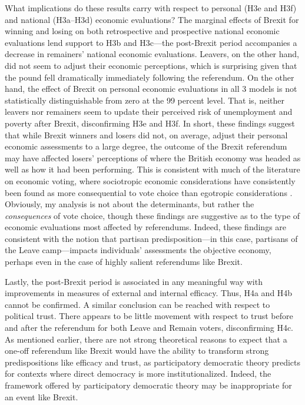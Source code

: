 \documentclass[12pt, letter]{article}
\begin{document}
What implications do these results carry with respect to personal (H3e and H3f) and national (H3a--H3d) economic evaluations? The marginal effects of Brexit for winning and losing on both retrospective and prospective national economic evaluations lend support to H3b and H3c---the post-Brexit period accompanies a decrease in remainers' national economic evaluations. Leavers, on the other hand, did not seem to adjust their economic perceptions, which is surprising given that the pound fell dramatically immediately following the referendum. On the other hand, the effect of Brexit on personal economic evaluations in all 3 models is not statistically distinguishable from zero at the 99 percent level. That is, neither leavers nor remainers seem to update their perceived risk of unemployment and poverty after Brexit, disconfirming H3e and H3f. In short, these findings suggest that while Brexit winners and losers did not, on average, adjust their personal economic assessments to a large degree, the outcome of the Brexit referendum may have affected losers' perceptions of where the British economy was headed as well as how it had been performing. This is consistent with much of the literature on economic voting, where sociotropic economic considerations have consistently been found as more consequential to vote choice than egotropic considerations \parencite{lewis2013vp}. Obviously, my analysis is not about the determinants, but rather the \textit{consequences} of vote choice, though these findings are suggestive as to the type of economic evaluations most affected by referendums. Indeed, these findings are consistent with the notion that partisan predisposition---in this case, partisans of the Leave camp---impacts individuals' assessments the objective economy, perhaps even in the case of highly salient referendums like Brexit. 

Lastly, the post-Brexit period is associated in any meaningful way with improvements in measures of external and internal efficacy. Thus, H4a and H4b cannot be confirmed. A similar conclusion can be reached with respect to political trust. There appears to be little movement with respect to trust before and after the referendum for both Leave and Remain voters, disconfirming H4c. As mentioned earlier, there are not strong theoretical reasons to expect that a one-off referendum like Brexit would have the ability to transform strong predispositions like efficacy and trust, as participatory democratic theory predicts for contexts where direct democracy is more institutionalized. Indeed, the framework offered by participatory democratic theory may be inappropriate for an event like Brexit. 
\end{document}
